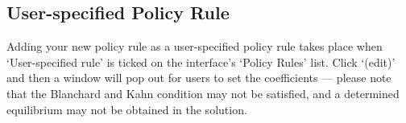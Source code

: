\documentclass[10pt,a4paper]{article}
\begin{document}
\subsection{User-specified Policy Rule}
\bigskip

Adding your new policy rule as a user-specified policy rule takes place when ‘User-specified rule’ is ticked on the interface’s ‘Policy Rules’ list. Click ‘(edit)’ and then a window will pop out for users to set the coefficients — please note that the Blanchard and Kahn condition may not be satisfied, and a determined equilibrium may not be obtained in the solution.



\end{document}
